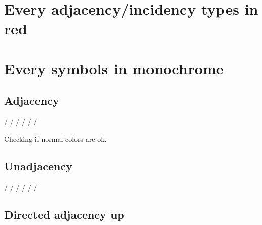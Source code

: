 \documentclass{article}
\begin{document}
\section{Every adjacency/incidency types in red}


\GTStestNormalSymbolsCalls



\section{Every symbols in monochrome}

\subsection{Adjacency}

\GTStestText{\GTSaM/}{\GTSaMR/}

\GTStestText{\GTSxa[m]}{\GTSxa[m,r]}


\GTStestEqualTextsI{\GTSaM/}{\GTSaMR/}%
{\GTSadjacencyMonochrome/}%
{\GTSadjacencyMonochromeRelation/}
\GTStestEqualTextsI{\GTSaM/}{\GTSaMR/}%
{\GTSadjMono/}%
{\GTSadjMonoRel/}
\GTStestEqualTextsI{\GTSaM/}{\GTSaMR/}%
{\GTSadjMon/}%
{\GTSadjMonRel/}

Checking if normal colors are ok.

\GTStestText{\GTSa/}{\GTSaR/}

\subsection{Unadjacency}

\GTStestText{\GTSuM/}{\GTSuMR/}

\GTStestText{\GTSxa[m,n]}{\GTSxa[m,n,r]}


\GTStestEqualTextsI{\GTSuM/}{\GTSuMR/}%
{\GTSunadjacencyMonochrome/}%
{\GTSunadjacencyMonochromeRelation/}
\GTStestEqualTextsI{\GTSuM/}{\GTSuMR/}%
{\GTSunadjMono/}%
{\GTSunadjMonoRel/}
\GTStestEqualTextsI{\GTSuM/}{\GTSuMR/}%
{\GTSunadjMon/}%
{\GTSunadjMonRel/}

\subsection{Directed adjacency up}

\GTStestText{\GTSdAUM/}{\GTSdAUMR/}
\end{document}
